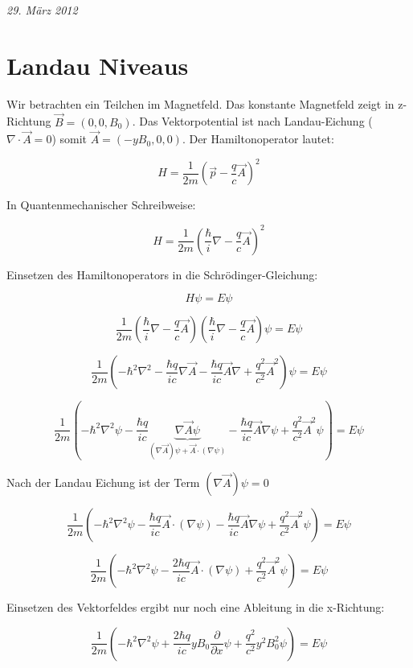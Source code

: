 



\textit{29. März 2012}


\section*{Landau Niveaus}

Wir betrachten ein Teilchen im Magnetfeld. Das konstante Magnetfeld zeigt in z-Richtung \(\vec B=(0,0,B_0)\). Das Vektorpotential ist nach Landau-Eichung (\(\nabla\cdot\vec A = 0\)) somit \(\vec A = (-yB_0,0,0)\). Der Hamiltonoperator lautet:

\[H=\frac{1}{2m}\left(\vec p - \frac{q}{c}\vec A\right)^2 \]


In Quantenmechanischer Schreibweise:

\[H=\frac{1}{2m}\left(\frac{\hbar}{i}\nabla - \frac{q}{c}\vec A\right)^2 \]

Einsetzen des Hamiltonoperators in die Schrödinger-Gleichung:

\[H\psi = E\psi\]

\[ \frac{1}{2m}\left(\frac{\hbar}{i}\nabla - \frac{q}{c}\vec A\right)\left(\frac{\hbar}{i}\nabla - \frac{q}{c}\vec A\right)\psi = E\psi \]

\[ \frac{1}{2m}\left(-\hbar^2\nabla^2 -\frac{\hbar q}{ic}\nabla \vec A -\frac{\hbar q}{ic} \vec A \nabla  + \frac{q^2}{c^2}\vec A^2 \right) \psi = E\psi \]


\[ \frac{1}{2m}\left(-\hbar^2\nabla^2\psi -\frac{\hbar q}{ic}\underbrace{\nabla \vec A\psi}_{(\nabla \vec A)\psi + \vec A\cdot(\nabla\psi)} -\frac{\hbar q}{ic} \vec A \nabla\psi  + \frac{q^2}{c^2}\vec A^2\psi \right) = E\psi \]

Nach der Landau Eichung ist der Term \((\nabla \vec A)\psi = 0\)

\[ \frac{1}{2m}\left(-\hbar^2\nabla^2\psi -\frac{\hbar q}{ic}\vec A\cdot(\nabla\psi) -\frac{\hbar q}{ic} \vec A \nabla\psi  + \frac{q^2}{c^2}\vec A^2\psi \right) = E\psi \]

\[ \frac{1}{2m}\left(-\hbar^2\nabla^2\psi - \frac{2 \hbar q}{ic}\vec A\cdot(\nabla\psi) + \frac{q^2}{c^2}\vec A^2\psi \right) = E\psi \]


Einsetzen des Vektorfeldes ergibt nur noch eine Ableitung in die x-Richtung:


\[ \frac{1}{2m}\left(-\hbar^2\nabla^2\psi + \frac{2 \hbar q}{ic} yB_0 \frac{\partial}{\partial x} \psi + \frac{q^2}{c^2}y^2B_0^2\psi \right) = E\psi \]

